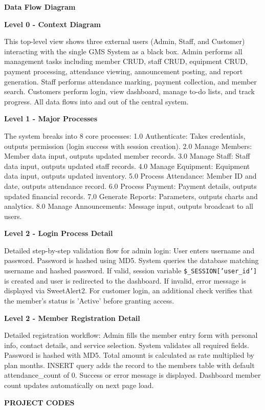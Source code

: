 \documentclass[12pt,a4paper]{report}
\begin{document}
\textbf{Data Flow Diagram}

\textbf{Level 0 - Context Diagram}

This top-level view shows three external users (Admin, Staff, and Customer) interacting with the single GMS System as a black box. Admin performs all management tasks including member CRUD, staff CRUD, equipment CRUD, payment processing, attendance viewing, announcement posting, and report generation. Staff performs attendance marking, payment collection, and member search. Customers perform login, view dashboard, manage to-do lists, and track progress. All data flows into and out of the central system.

\textbf{Level 1 - Major Processes}

The system breaks into 8 core processes:
1.0 Authenticate: Takes credentials, outputs permission (login success with session creation).
2.0 Manage Members: Member data input, outputs updated member records.
3.0 Manage Staff: Staff data input, outputs updated staff records.
4.0 Manage Equipment: Equipment data input, outputs updated inventory.
5.0 Process Attendance: Member ID and date, outputs attendance record.
6.0 Process Payment: Payment details, outputs updated financial records.
7.0 Generate Reports: Parameters, outputs charts and analytics.
8.0 Manage Announcements: Message input, outputs broadcast to all users.

\textbf{Level 2 - Login Process Detail}

Detailed step-by-step validation flow for admin login: User enters username and password. Password is hashed using MD5. System queries the database matching username and hashed password. If valid, session variable \texttt{\$\_SESSION['user\_id']} is created and user is redirected to the dashboard. If invalid, error message is displayed via SweetAlert2. For customer login, an additional check verifies that the member's status is 'Active' before granting access.

\textbf{Level 2 - Member Registration Detail}

Detailed registration workflow: Admin fills the member entry form with personal info, contact details, and service selection. System validates all required fields. Password is hashed with MD5. Total amount is calculated as rate multiplied by plan months. INSERT query adds the record to the members table with default attendance\_count of 0. Success or error message is displayed. Dashboard member count updates automatically on next page load.

\newpage
\vspace*{\fill}
\begin{center}
{\LARGE \textbf{PROJECT CODES}}
\end{center}
\vspace*{\fill}
\newpage
\end{document}
